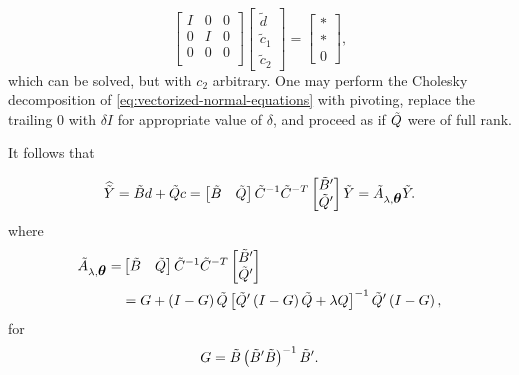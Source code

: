\begin{equation} \label{eq:vectorized-normal-equations-cholesky-2}
\begin{bmatrix}
I & 0 & 0\\
0 & I & 0 \\
0 & 0 & 0 \\
\end{bmatrix}
\begin{bmatrix}
\tilde{d}\\
\tilde{c}_1\\
\tilde{c}_2
\end{bmatrix}
= \begin{bmatrix}
* \\
* \\
0
\end{bmatrix},
\end{equation}
\noindent
which can be solved, but with $c_2$ arbitrary. One may perform the Cholesky decomposition of \ref{eq:vectorized-normal-equations} with pivoting, replace the trailing $0$ with $\delta I$ for appropriate value of $\delta$, and proceed as if $\tilde{Q}$ were of full rank. 
\bigskip

It follows that

\begin{equation} \label{eq:tildeY-hat-equals-tildeA-tildeY}
\widehat{\tilde{Y}} = \tilde{B} d + \tilde{Q} c = \begin{bmatrix} \tilde{B} & \tilde{Q} \end{bmatrix} \tilde{C}^{-1} \tilde{C}^{-T} \begin{bmatrix} \tilde{B}' \\ \tilde{Q}' \end{bmatrix} \tilde{Y} = \tilde{A}_{\lambda,\mbox{\boldmath $\theta$}} \tilde{Y}.
\end{equation} 
\noindent
where
\begin{align}
\begin{split} \label{eq:smoothing-matrix-A-tilde}
\tilde{A}_{\lambda,\mbox{\boldmath $\theta$}} =& \begin{bmatrix} \tilde{B} & \tilde{Q} \end{bmatrix} \tilde{C}^{-1} \tilde{C}^{-T} \begin{bmatrix} \tilde{B}' \\ \tilde{Q}' \end{bmatrix}  \\
&= G + \left(I - G\right) \tilde{Q} \left[\tilde{Q}'\left( I - G \right)\tilde{Q} + \lambda Q\right]^{-1} \tilde{Q}'\left(I - G\right),
\end{split}
\end{align} 
\noindent
for
\[
G = \tilde{B}\left(\tilde{B}' \tilde{B} \right)^{-1}\tilde{B}'.
\]



